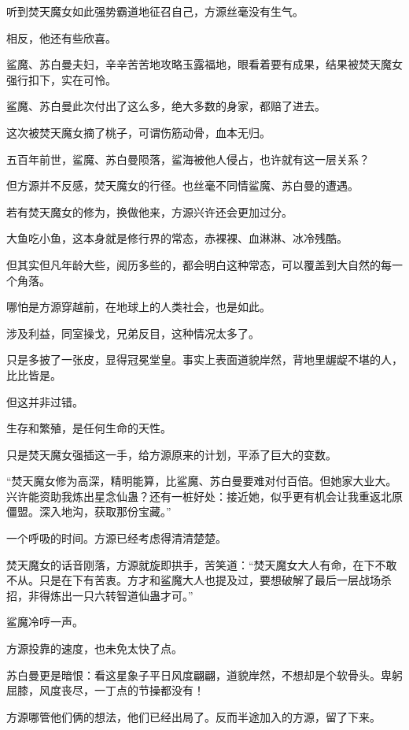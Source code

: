 
\begin{this_body}

听到焚天魔女如此强势霸道地征召自己，方源丝毫没有生气。

相反，他还有些欣喜。

鲨魔、苏白曼夫妇，辛辛苦苦地攻略玉露福地，眼看着要有成果，结果被焚天魔女强行扣下，实在可怜。

鲨魔、苏白曼此次付出了这么多，绝大多数的身家，都赔了进去。

这次被焚天魔女摘了桃子，可谓伤筋动骨，血本无归。

五百年前世，鲨魔、苏白曼陨落，鲨海被他人侵占，也许就有这一层关系？

但方源并不反感，焚天魔女的行径。也丝毫不同情鲨魔、苏白曼的遭遇。

若有焚天魔女的修为，换做他来，方源兴许还会更加过分。

大鱼吃小鱼，这本身就是修行界的常态，赤裸裸、血淋淋、冰冷残酷。

但其实但凡年龄大些，阅历多些的，都会明白这种常态，可以覆盖到大自然的每一个角落。

哪怕是方源穿越前，在地球上的人类社会，也是如此。

涉及利益，同室操戈，兄弟反目，这种情况太多了。

只是多披了一张皮，显得冠冕堂皇。事实上表面道貌岸然，背地里龌龊不堪的人，比比皆是。

但这并非过错。

生存和繁殖，是任何生命的天性。

只是焚天魔女强插这一手，给方源原来的计划，平添了巨大的变数。

“焚天魔女修为高深，精明能算，比鲨魔、苏白曼要难对付百倍。但她家大业大。兴许能资助我炼出星念仙蛊？还有一桩好处：接近她，似乎更有机会让我重返北原僵盟。深入地沟，获取那份宝藏。”

一个呼吸的时间。方源已经考虑得清清楚楚。

焚天魔女的话音刚落，方源就旋即拱手，苦笑道：“焚天魔女大人有命，在下不敢不从。只是在下有苦衷。方才和鲨魔大人也提及过，要想破解了最后一层战场杀招，非得炼出一只六转智道仙蛊才可。”

鲨魔冷哼一声。

方源投靠的速度，也未免太快了点。

苏白曼更是暗恨：看这星象子平日风度翩翩，道貌岸然，不想却是个软骨头。卑躬屈膝，风度丧尽，一丁点的节操都没有！

方源哪管他们俩的想法，他们已经出局了。反而半途加入的方源，留了下来。


\end{this_body}
